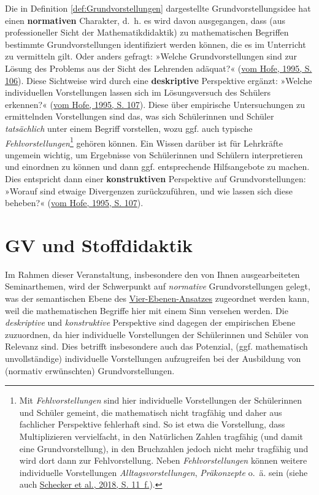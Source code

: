 \documentclass[
]{scrbook}
\theoremstyle{definition}
\theoremstyle{definition}
\theoremstyle{definition}
\theoremstyle{definition}
\theoremstyle{remark}
\begin{document}
Die in Definition \ref{def:Grundvorstellungen} dargestellte Grundvorstellungsidee hat einen \textbf{normativen} Charakter, d.~h. es wird davon ausgegangen, dass (aus professioneller Sicht der Mathematikdidaktik) zu mathematischen Begriffen bestimmte Grundvorstellungen identifiziert werden können, die es im Unterricht zu vermitteln gilt. Oder anders gefragt: »Welche Grundvorstellungen sind zur Lösung des Problems aus der Sicht des Lehrenden adäquat?« (\protect\hyperlink{ref-Hofe:1995}{vom Hofe, 1995, S. 106}). Diese Sichtweise wird durch eine \textbf{deskriptive} Perspektive ergänzt: »Welche individuellen Vorstellungen lassen sich im Lösungsversuch des Schülers erkennen?« (\protect\hyperlink{ref-Hofe:1995}{vom Hofe, 1995, S. 107}). Diese über empirische Untersuchungen zu ermittelnden Vorstellungen sind das, was sich Schülerinnen und Schüler \emph{tatsächlich} unter einem Begriff vorstellen, wozu ggf. auch typische \emph{Fehlvorstellungen}\footnote{Mit \emph{Fehlvorstellungen} sind hier individuelle Vorstellungen der Schülerinnen und Schüler gemeint, die mathematisch nicht tragfähig und daher aus fachlicher Perspektive fehlerhaft sind. So ist etwa die Vorstellung, dass Multiplizieren vervielfacht, in den Natürlichen Zahlen tragfähig (und damit eine Grundvorstellung), in den Bruchzahlen jedoch nicht mehr tragfähig und wird dort dann zur Fehlvorstellung. Neben \emph{Fehlvorstellungen} können weitere individuelle Vorstellungen \emph{Alltagsvorstellungen}, \emph{Präkonzepte} o.~ä. sein (siehe auch \protect\hyperlink{ref-Schecker2018}{Schecker et al., 2018, S. 11~f.}).} gehören können. Ein Wissen darüber ist für Lehrkräfte ungemein wichtig, um Ergebnisse von Schülerinnen und Schülern interpretieren und einordnen zu können und dann ggf. entsprechende Hilfsangebote zu machen. Dies entspricht dann einer \textbf{konstruktiven} Perspektive auf Grundvorstellungen: »Worauf sind etwaige Divergenzen zurückzuführen, und wie lassen sich diese beheben?« (\protect\hyperlink{ref-Hofe:1995}{vom Hofe, 1995, S. 107}).

\hypertarget{gv-und-stoffdidaktik}{%
\section{GV und Stoffdidaktik}\label{gv-und-stoffdidaktik}}

Im Rahmen dieser Veranstaltung, insbesondere den von Ihnen ausgearbeiteten Seminarthemen, wird der Schwerpunkt auf \emph{normative} Grundvorstellungen gelegt, was der \textcolor{semanticColor}{semantischen Ebene} des \protect\hyperlink{tab:fragen-ebenen}{Vier-Ebenen-Ansatzes} zugeordnet werden kann, weil die mathematischen Begriffe hier mit einem Sinn versehen werden. Die \emph{deskriptive} und \emph{konstruktive} Perspektive sind dagegen der \textcolor{empiricColor}{empirischen Ebene} zuzuordnen, da hier individuelle Vorstellungen der Schülerinnen und Schüler von Relevanz sind. Dies betrifft insbesondere auch das Potenzial, (ggf. mathematisch unvollständige) individuelle Vorstellungen aufzugreifen bei der Ausbildung von (normativ erwünschten) Grundvorstellungen.
\end{document}
